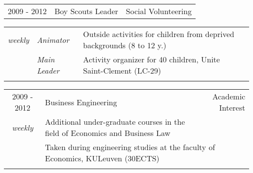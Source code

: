 \documentclass[a4paper,10pt]{article}
\begin{document}
\begin{tabularx}{\textwidth}{cXr}     
\textsc{2009 - 2012} & Boy Scouts Leader & Social Volunteering \\
\end{tabularx}
\begin{tabularx}{\textwidth}{clXr}
\textit{weekly} & \textit{Animator} & Outside activities for children from deprived backgrounds (8 to 12 y.) \\
\hspace{55pt} & \textit{Main Leader} & Activity organizer for 40 children, Unite Saint-Clement (LC-29) \\
\\
\end{tabularx}

\begin{tabularx}{\textwidth}{cXr}     
\textsc{2009 - 2012} & Business Engineering & Academic Interest \\
\textit{weekly} & Additional under-graduate courses in the field of Economics and Business Law \\
\hspace{55pt} & \multicolumn{2}{l}{Taken during engineering studies at the faculty of Economics, KULeuven (30ECTS)} \\
\\
\end{tabularx}

%
\end{document}
